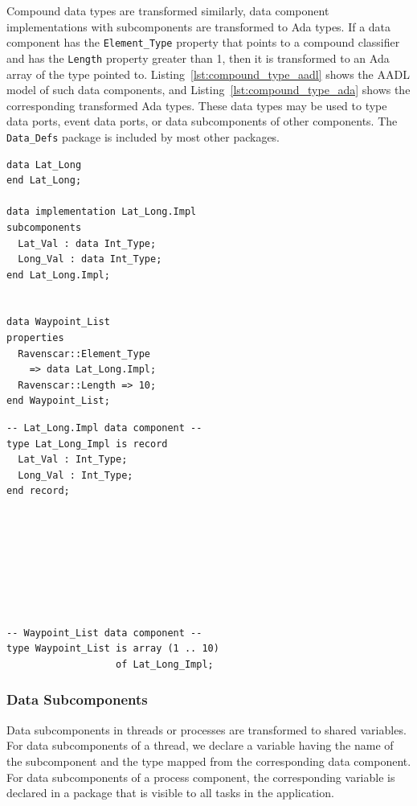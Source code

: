 Compound data types are transformed similarly, data component
implementations with subcomponents are transformed to Ada 
types. If a data component has the \texttt{Element\_Type} property
that points to a compound classifier and has the \texttt{Length}
property greater than 1, then it is transformed to an Ada array of the
type pointed to. Listing~\ref{lst:compound_type_aadl} shows the AADL
model of such data components, and Listing~\ref{lst:compound_type_ada}
shows the corresponding transformed Ada types. These data types may be
used to type data ports, event data ports, or data subcomponents of
other components. The \texttt{Data\_Defs} package is included by most
other packages.

\begin{minipage}{0.45\linewidth}
\lstset{language=aadl}
\begin{lstlisting}[label=lst:compound_type_aadl, caption=Compound
    types in AADL.]
data Lat_Long
end Lat_Long;

data implementation Lat_Long.Impl
subcomponents
  Lat_Val : data Int_Type;
  Long_Val : data Int_Type;
end Lat_Long.Impl;


data Waypoint_List
properties
  Ravenscar::Element_Type
    => data Lat_Long.Impl;
  Ravenscar::Length => 10;
end Waypoint_List;
\end{lstlisting}
\end{minipage}
\hspace{5mm}
\begin{minipage}{0.45\linewidth}
\lstset{language=ada}
\begin{lstlisting}[label=lst:compound_type_ada, caption=The
    transformed types in Ada.]
-- Lat_Long.Impl data component --
type Lat_Long_Impl is record
  Lat_Val : Int_Type;
  Long_Val : Int_Type;
end record;








-- Waypoint_List data component --
type Waypoint_List is array (1 .. 10) 
                   of Lat_Long_Impl;
\end{lstlisting}
\end{minipage}

\subsubsection{Data Subcomponents}
Data subcomponents in threads or processes are transformed to shared
variables.  For data subcomponents of a thread, we declare a variable
having the name of the subcomponent and the type mapped from the
corresponding data component. For data subcomponents of a process
component, the corresponding variable is declared in a package that is
visible to all tasks in the application.


